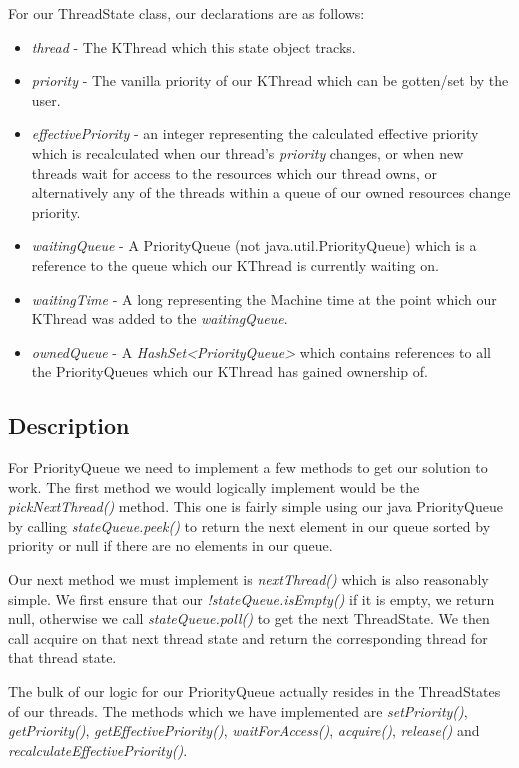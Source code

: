 \documentclass{article}
\begin{document}
For our ThreadState class, our declarations are as follows:
\begin{itemize}
\item \textit{thread} - The KThread which this state object tracks.
\item \textit{priority} - The vanilla priority of our KThread which can be gotten/set by the user.
\item \textit{effectivePriority} - an integer representing the calculated effective priority which is recalculated
when our thread's \textit{priority} changes, or when new threads wait for access to the resources which our thread
owns, or alternatively any of the threads within a queue of our owned resources change priority.
\item \textit{waitingQueue} - A PriorityQueue (not java.util.PriorityQueue) which is a reference to the queue which
our KThread is currently waiting on.
\item \textit{waitingTime} - A long representing the Machine time at the point which our KThread was added to the
\textit{waitingQueue}.
\item \textit{ownedQueue} - A \textit{HashSet<PriorityQueue>} which contains references to all the PriorityQueues
which our KThread has gained ownership of.
\end{itemize}

\subsection*{Description}

For PriorityQueue we need to implement a few methods to get our solution to work. The first method we would logically
implement would be the \textit{pickNextThread()} method. This one is fairly simple using our java PriorityQueue by calling
\textit{stateQueue.peek()} to return the next element in our queue sorted by priority or null if there are no elements
in our queue.

Our next method we must implement is \textit{nextThread()} which is also reasonably simple. We first ensure that our
\textit{!stateQueue.isEmpty()} if it is empty, we return null, otherwise we call \textit{stateQueue.poll()} to get
the next ThreadState. We then call acquire on that next thread state and return the corresponding thread for that thread
state.

The bulk of our logic for our PriorityQueue actually resides in the ThreadStates of our threads. The methods which
we have implemented are \textit{setPriority()}, \textit{getPriority()}, \textit{getEffectivePriority()},
\textit{waitForAccess()}, \textit{acquire()}, \textit{release()} and \textit{recalculateEffectivePriority()}.
\end{document}
